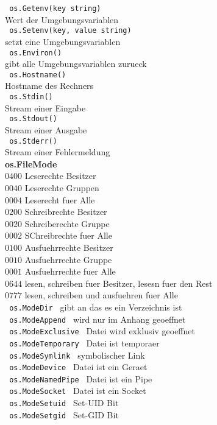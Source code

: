 \documentclass[twoside,a4paper,12pt]{article}
\begin{document}
\begin{tabbing}
 \> \verb| os.Getenv(key string) | \\ 
 \> Wert der Umgebungsvariablen \\ 
 \> \verb| os.Setenv(key, value string) | \\ 
 \> setzt eine Umgebungsvariablen \\ 
 \> \verb| os.Environ() | \\ 
 \> gibt alle Umgebungsvariablen zurueck \\ 
 \> \verb| os.Hostname() | \\ 
 \> Hostname des Rechners \\ 
 \> \verb| os.Stdin() | \\ 
 \> Stream einer Eingabe \\ 
 \> \verb| os.Stdout() | \\ 
 \> Stream einer Ausgabe \\ 
 \> \verb| os.Stderr() | \\ 
 \> Stream einer Fehlermeldung \\ 
 \> \textbf{os.FileMode} \\
 \> $0400$ \> Leserechte Besitzer \\ 
 \> $0040$ \> Leserechte Gruppen \\
 \> $0004$ \> Leserecht fuer Alle \\
 \> $0200$ \> Schreibrechte Besitzer \\ 
 \> $0020$ \> Schreiberechte Gruppe \\
 \> $0002$ \> SChreibrechte fuer Alle \\ 
 \> $0100$ \> Ausfuehrrechte Besitzer \\ 
 \> $0010$ \> Ausfuehrrechte Gruppe \\ 
 \> $0001$ \> Ausfuehrrechte fuer Alle \\
 \> $0644$ \> lesen, schreiben fuer Besitzer, lesesn fuer den Rest \\ 
 \> $0777$ \> lesen, schreiben und ausfuehren fuer Alle \\
 \> \verb| os.ModeDir | \> gibt an das es ein Verzeichnis ist \\ 
 \> \verb| os.ModeAppend | \> wird nur im Anhang geoeffnet \\ 
 \> \verb| os.ModeExclusive | \> Datei wird exklusiv geoeffnet \\ 
 \> \verb| os.ModeTemporary | \> Datei ist temporaer \\ 
 \> \verb| os.ModeSymlink | \> symbolischer Link \\ 
 \> \verb| os.ModeDevice | \> Datei ist ein Geraet \\ 
 \> \verb| os.ModeNamedPipe | \> Datei ist ein Pipe \\ 
 \> \verb| os.ModeSocket | \> Datei ist ein Socket \\ 
 \> \verb| os.ModeSetuid | \> Set-UID Bit \\ 
 \> \verb| os.ModeSetgid | \> Set-GID Bit \\ 
 \end{tabbing}
\end{document}
